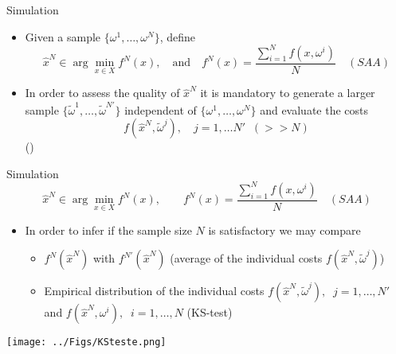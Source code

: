 \begin{frame}{Simulation}

\begin{itemize}
\item Given a sample $\{\omega^1,\ldots,\omega^N\}$, define
\[
\hat x^N \in \arg \min_{x \in X} f^N(x), \quad \mbox{and}\quad f^N(x)=\frac{\sum_{i=1}^N f(x,\omega^i)}{N}\quad (SAA)
\]
\pula
\item In order to assess the quality of $\hat x^N$ it is mandatory to generate a  larger sample $\{\tilde \omega^1,\ldots,\tilde \omega^{N'}\}$ independent of $\{\omega^1,\ldots,\omega^N\}$ and evaluate the costs
\[
f(\hat x^N, \tilde \omega^j), \quad j=1,\ldots N' \;\; (>> N)
\]
()
\end{itemize}

 \end{frame}



\begin{frame}{Simulation}
\[
\hat x^N \in \arg \min_{x \in X} f^N(x), \quad \quad f^N(x)=\frac{\sum_{i=1}^N f(x,\omega^i)}{N}\quad (SAA)
\]

\begin{itemize}
\item In order to infer if the sample size $N$  is satisfactory we may compare
\pula
\begin{itemize}
\item $f^N(\hat x^N)$ with $f^{N'}(\hat x^N)$   (average of the individual costs $f(\hat x^N, \tilde \omega^j)$)
\pula

\item Empirical distribution of the individual costs  $f(\hat x^N, \tilde \omega^j),\;\;j=1,\ldots,N'$ and $f(\hat x^N,\omega^i),\;\;i=1,\ldots,N$ (KS-test)
\end{itemize}
\end{itemize}

\begin{center}
\texttt{[image: ../Figs/KSteste.png]} {}
\end{center}
 \end{frame}

